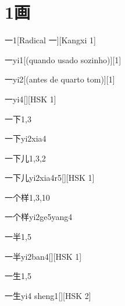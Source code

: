 
\section*{1画}

\begin{entry}{一}{1}[Radical 一][Kangxi 1]
  \begin{phonetics}{一}{yi1}[(quando usado sozinho)][1]
  \end{phonetics}
  \begin{phonetics}{一}{yi2}[(antes de quarto tom)][1]
  \end{phonetics}
  \begin{phonetics}{一}{yi4}[][HSK 1]
  \end{phonetics}
\end{entry}

\begin{entry}{一下}{1,3}
  \begin{phonetics}{一下}{yi2xia4}
  \end{phonetics}
\end{entry}

\begin{entry}{一下儿}{1,3,2}
  \begin{phonetics}{一下儿}{yi2xia4r5}[][HSK 1]
  \end{phonetics}
\end{entry}

\begin{entry}{一个样}{1,3,10}
  \begin{phonetics}{一个样}{yi2ge5yang4}
  \end{phonetics}
\end{entry}

\begin{entry}{一半}{1,5}
  \begin{phonetics}{一半}{yi2ban4}[][HSK 1]
  \end{phonetics}
\end{entry}

\begin{entry}{一生}{1,5}
  \begin{phonetics}{一生}{yi4 sheng1}[][HSK 2]
  \end{phonetics}
\end{entry}

